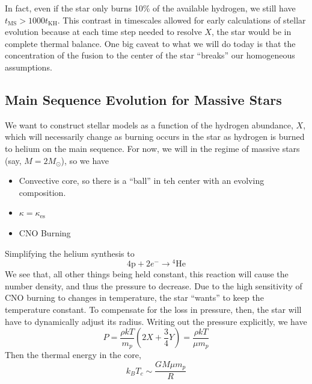 \documentclass[10pt]{article}
\numberwithin{equation}{section}
\newcommand{\n}{\noindent}
\begin{document}
    \n In fact, even if the star only burns 10\% of the available
    hydrogen, we still have $t_{\mathrm{MS}}>1000
    t_{\mathrm{KH}}$. This contrast in timescales allowed for early
    calculations of stellar evolution because at each time step needed
    to resolve $X$, the star would be in complete thermal balance. One
    big caveat to what we will do today is that the concentration of
    the fusion to the center of the star ``breaks'' our homogeneous
    assumptions.

    \subsection{Main Sequence Evolution for Massive Stars}
    \label{sec:main-sequ-evol}

    We want to construct stellar models as a function of the hydrogen
    abundance, $X$, which will necessarily change as burning occurs in
    the star as hydrogen is burned to helium on the main sequence. For
    now, we will in the regime of massive stars (say, $M=2M_\odot$),
    so we have
    \begin{itemize}
    \item Convective core, so there is a ``ball'' in teh center with
      an evolving composition.
    \item $\kappa=\kappa_{\mathrm{es}}$
    \item CNO Burning
    \end{itemize}
    Simplifying the helium synthesis to
    \begin{equation}
      \label{eq:227}
      4\mathrm{p}+2e^-\to {}^4\mathrm{He}
    \end{equation}
    We see that, all other things being held constant, this reaction
    will cause the number density, and thus the pressure to
    decrease. Due to the high sensitivity of CNO burning to changes in
    temperature, the star ``wants'' to keep the temperature
    constant. To compensate for the loss in pressure, then, the star
    will have to dynamically adjust its radius. Writing out the
    pressure explicitly, we have
    \begin{equation}
      \label{eq:228}
      P=\frac{\rho kT}{m_p}\left(2X+\frac{3}{4}Y\right)=\frac{\rho
        kT}{\mu m_p}
    \end{equation}
    Then the thermal energy in the core,
    \begin{equation}
      \label{eq:229}
      k_B T_c\sim\frac{GM\mu m_p}{R}
    \end{equation}
\end{document}
